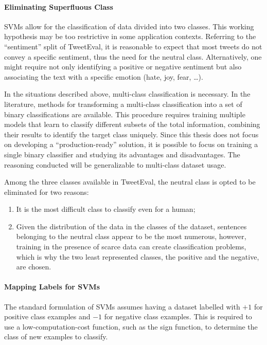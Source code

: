 \paragraph{Eliminating Superfluous Class} SVMs allow for the classification of data divided into two classes. This working hypothesis may be too restrictive in some application contexts. Referring to the ``sentiment'' split of TweetEval, it is reasonable to expect that most tweets do not convey a specific sentiment, thus the need for the neutral class. Alternatively, one might require not only identifying a positive or negative sentiment but also associating the text with a specific emotion (hate, joy, fear, \dots).

In the situations described above, multi-class classification is necessary. In the literature, methods for transforming a multi-class classification into a set of binary classifications are available\cite{multiclass}. This procedure requires training multiple models that learn to classify different subsets of the total information, combining their results to identify the target class uniquely. Since this thesis does not focus on developing a ``production-ready'' solution, it is possible to focus on training a single binary classifier and studying its advantages and disadvantages. The reasoning conducted will be generalizable to multi-class dataset usage.

Among the three classes available in TweetEval, the neutral class is opted to be eliminated for two reasons:
\begin{enumerate}
    \item It is the most difficult class to classify even for a human;
    \item Given the distribution of the data in the classes of the dataset, sentences belonging to the neutral class appear to be the most numerous, however, training in the presence of scarce data can create classification problems, which is why the two least represented classes, the positive and the negative, are chosen.
\end{enumerate}

\paragraph{Mapping Labels for SVMs} The standard formulation of SVMs assumes having a dataset labelled with $+1$ for positive class examples and $-1$ for negative class examples. This is required to use a low-computation-cost function, such as the sign function, to determine the class of new examples to classify.

